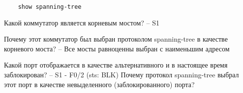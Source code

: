 \begin{verbatim}
    show spanning-tree
\end{verbatim}


Какой коммутатор является корневым мостом? -- S1 \par
Почему этот коммутатор был выбран протоколом spanning-tree в качестве корневого моста? -- Все мосты равноценны выбран с
наименьшим адресом
\par
Какой порт отображается в качестве альтернативного и в настоящее время заблокирован? -- S1 - F0/2 (sts: BLK)
Почему протокол spanning-tree выбрал этот порт в качестве невыделенного (заблокированного) порта?
